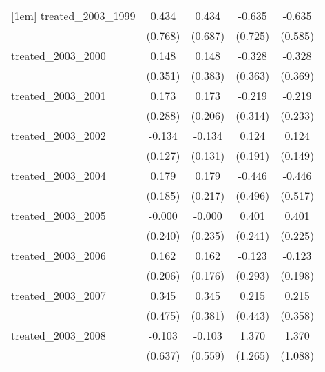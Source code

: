 {\begin{tabular}{l*{4}{c}}
[1em]
treated\_2003\_1999&       0.434         &       0.434         &      -0.635         &      -0.635         \\
            &     (0.768)         &     (0.687)         &     (0.725)         &     (0.585)         \\
[1em]
treated\_2003\_2000&       0.148         &       0.148         &      -0.328         &      -0.328         \\
            &     (0.351)         &     (0.383)         &     (0.363)         &     (0.369)         \\
[1em]
treated\_2003\_2001&       0.173         &       0.173         &      -0.219         &      -0.219         \\
            &     (0.288)         &     (0.206)         &     (0.314)         &     (0.233)         \\
[1em]
treated\_2003\_2002&      -0.134         &      -0.134         &       0.124         &       0.124         \\
            &     (0.127)         &     (0.131)         &     (0.191)         &     (0.149)         \\
[1em]
treated\_2003\_2004&       0.179         &       0.179         &      -0.446         &      -0.446         \\
            &     (0.185)         &     (0.217)         &     (0.496)         &     (0.517)         \\
[1em]
treated\_2003\_2005&      -0.000         &      -0.000         &       0.401         &       0.401         \\
            &     (0.240)         &     (0.235)         &     (0.241)         &     (0.225)         \\
[1em]
treated\_2003\_2006&       0.162         &       0.162         &      -0.123         &      -0.123         \\
            &     (0.206)         &     (0.176)         &     (0.293)         &     (0.198)         \\
[1em]
treated\_2003\_2007&       0.345         &       0.345         &       0.215         &       0.215         \\
            &     (0.475)         &     (0.381)         &     (0.443)         &     (0.358)         \\
[1em]
treated\_2003\_2008&      -0.103         &      -0.103         &       1.370         &       1.370         \\
            &     (0.637)         &     (0.559)         &     (1.265)         &     (1.088)         \\

\end{tabular}}
